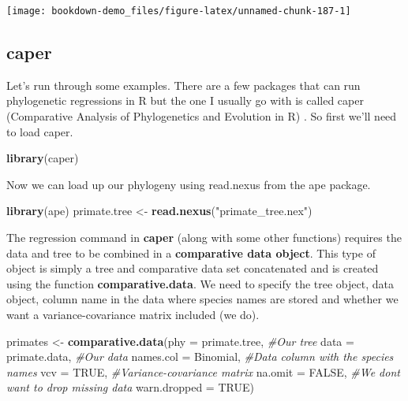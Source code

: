 \documentclass[
]{book}
\newenvironment{Shaded}{\begin{snugshade}}{\end{snugshade}}
\newcommand{\CommentTok}[1]{\textcolor[rgb]{0.56,0.35,0.01}{\textit{#1}}}
\newcommand{\DataTypeTok}[1]{\textcolor[rgb]{0.13,0.29,0.53}{#1}}
\newcommand{\KeywordTok}[1]{\textcolor[rgb]{0.13,0.29,0.53}{\textbf{#1}}}
\newcommand{\NormalTok}[1]{#1}
\newcommand{\OtherTok}[1]{\textcolor[rgb]{0.56,0.35,0.01}{#1}}
\newcommand{\StringTok}[1]{\textcolor[rgb]{0.31,0.60,0.02}{#1}}
\begin{document}
\begin{center}\texttt{[image: bookdown-demo\_files/figure-latex/unnamed-chunk-187-1]} \end{center}

\hypertarget{caper}{%
\subsection{caper}\label{caper}}

Let's run through some examples. There are a few packages that can run phylogenetic regressions in R but the one I usually go with is called caper (Comparative Analysis of Phylogenetics and Evolution in R) \citep{caper}. So first we'll need to load caper.

\begin{Shaded}
\begin{Highlighting}[]
\KeywordTok{library}\NormalTok{(caper)}
\end{Highlighting}
\end{Shaded}

Now we can load up our phylogeny using read.nexus from the ape package.

\begin{Shaded}
\begin{Highlighting}[]
\KeywordTok{library}\NormalTok{(ape)}
\NormalTok{primate.tree \textless{}{-}}\StringTok{ }\KeywordTok{read.nexus}\NormalTok{(}\StringTok{"primate\_tree.nex"}\NormalTok{)}
\end{Highlighting}
\end{Shaded}

The regression command in \textbf{caper} (along with some other functions) requires the data and tree to be combined in a \textbf{comparative data object}. This type of object is simply a tree and comparative data set concatenated and is created using the function \textbf{comparative.data}. We need to specify the tree object, data object, column name in the data where species names are stored and whether we want a variance-covariance matrix included (we do).

\begin{Shaded}
\begin{Highlighting}[]
\NormalTok{primates \textless{}{-}}\StringTok{ }\KeywordTok{comparative.data}\NormalTok{(}\DataTypeTok{phy =}\NormalTok{ primate.tree,     }\CommentTok{\#Our tree}
                             \DataTypeTok{data =}\NormalTok{ primate.data,    }\CommentTok{\#Our data}
                             \DataTypeTok{names.col =}\NormalTok{ Binomial,   }\CommentTok{\#Data column with the species names}
                             \DataTypeTok{vcv =} \OtherTok{TRUE}\NormalTok{,             }\CommentTok{\#Variance{-}covariance matrix}
                             \DataTypeTok{na.omit =} \OtherTok{FALSE}\NormalTok{,        }\CommentTok{\#We don\textquotesingle{}t want to drop missing data}
                             \DataTypeTok{warn.dropped =} \OtherTok{TRUE}\NormalTok{)}
\end{Highlighting}
\end{Shaded}
\end{document}
